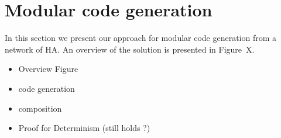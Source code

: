 \section{Modular code generation}
\label{sec:codeGen}
In this section we present our approach for modular code generation from
a network of \ac{HA}. 
An overview of the solution is presented in Figure~X.

\begin{itemize}
	\item Overview Figure
	\item code generation
	\item composition
	\item Proof for Determinism (still holds ?)
\end{itemize}
